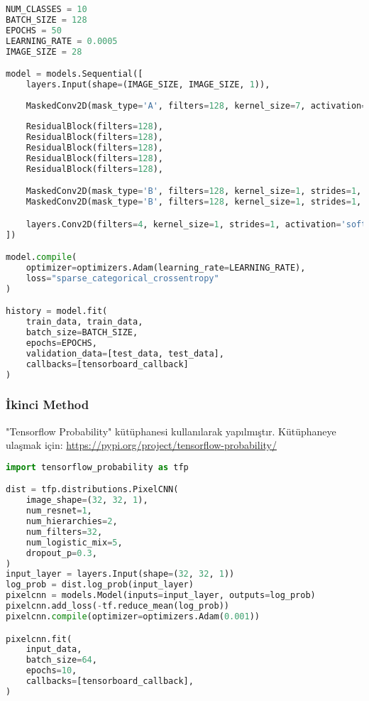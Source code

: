 \begin{lstlisting}[language=Python]
NUM_CLASSES = 10
BATCH_SIZE = 128
EPOCHS = 50
LEARNING_RATE = 0.0005
IMAGE_SIZE = 28

model = models.Sequential([
    layers.Input(shape=(IMAGE_SIZE, IMAGE_SIZE, 1)),
    
    MaskedConv2D(mask_type='A', filters=128, kernel_size=7, activation='relu', padding='same'),
    
    ResidualBlock(filters=128),
    ResidualBlock(filters=128),
    ResidualBlock(filters=128),
    ResidualBlock(filters=128),
    ResidualBlock(filters=128),

    MaskedConv2D(mask_type='B', filters=128, kernel_size=1, strides=1, activation='relu', padding='valid'),
    MaskedConv2D(mask_type='B', filters=128, kernel_size=1, strides=1, activation='relu', padding='valid'),

    layers.Conv2D(filters=4, kernel_size=1, strides=1, activation='softmax', padding='valid')
])

model.compile(
    optimizer=optimizers.Adam(learning_rate=LEARNING_RATE),
    loss="sparse_categorical_crossentropy"
)

history = model.fit(
    train_data, train_data,
    batch_size=BATCH_SIZE,
    epochs=EPOCHS,
    validation_data=[test_data, test_data],
    callbacks=[tensorboard_callback]
)
\end{lstlisting}

\subsubsection{İkinci Method}

"Tensorflow Probability" kütüphanesi kullanılarak yapılmıştır. Kütüphaneye ulaşmak için: \url{https://pypi.org/project/tensorflow-probability/}

\begin{lstlisting}[language=Python]
import tensorflow_probability as tfp

dist = tfp.distributions.PixelCNN(
    image_shape=(32, 32, 1),
    num_resnet=1,
    num_hierarchies=2,
    num_filters=32,
    num_logistic_mix=5,
    dropout_p=0.3,
)
input_layer = layers.Input(shape=(32, 32, 1))
log_prob = dist.log_prob(input_layer)
pixelcnn = models.Model(inputs=input_layer, outputs=log_prob)
pixelcnn.add_loss(-tf.reduce_mean(log_prob))
pixelcnn.compile(optimizer=optimizers.Adam(0.001))

pixelcnn.fit(
    input_data,
    batch_size=64,
    epochs=10,
    callbacks=[tensorboard_callback],
)
\end{lstlisting}

\newpage